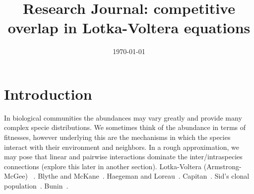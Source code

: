 \documentclass[11pt,a4paper,final]{iopart}
\begin{document}
\title[Research Journal: Competitive Overlap]{Research Journal: competitive overlap in Lotka-Voltera equations}
\date{\today}

\iffalse
\author{Jeremy Rothschild$^1$}
\address{$^1$University of Toronto, Toronto}

\ead{rothschild@physics.utoronto.ca}

\author{Author Two}
\address{Address Three, Neverland}
\ead{author.two@mail.com}

\author[cor1]{Author Three}
\address{Address Four, Neverland}
\eads{\mailto{author.three@mail.com}, \mailto{author.three@gmail.com}}


\begin{abstract}
This document describes the  preparation of an article using \LaTeXe\ and 
\verb"iopart.cls" (the IOP \LaTeXe\ preprint class file).
This class file is designed to help 
authors produce preprints in a form suitable for submission to any of the
journals published by IOP Publishing.
Authors submitting to any IOP journal, i.e.\ 
both single- and double-column ones, should follow the guidelines set out here. 
On acceptance, their TeX code will be converted to 
the appropriate format for the journal concerned.

\end{abstract}

\vspace{2pc}
\noindent{\it Keywords}: Article preparation, IOP journals
\submitto{\JPA}
\fi

\section{Introduction}

In biological communities the abundances may vary greatly and provide many complex specie distributions. 
We sometimes think of the abundance in terms of fitnesses, however underlying this are the mechanisms in which the species interact with their environment and neighbors. 
In a rough approximation, we may pose that linear and pairwise interactions dominate the inter/intraspecies connections (explore this later in another section). 
Lotka-Voltera (Armstrong-McGee) ~\cite{Lotka1950,Smale1976a,Armstrong1976}. 
Blythe and McKane~\cite{Baxter2005,Baxter2006,Blythe2007}. 
Haegeman and Loreau~\cite{Haegeman2011}. 
Capitan~\cite{Capitan2015,Capitan2017}. 
Sid's clonal population~\cite{Goyal2015}. 
Bunin~\cite{Bunin2016}.
\end{document}
